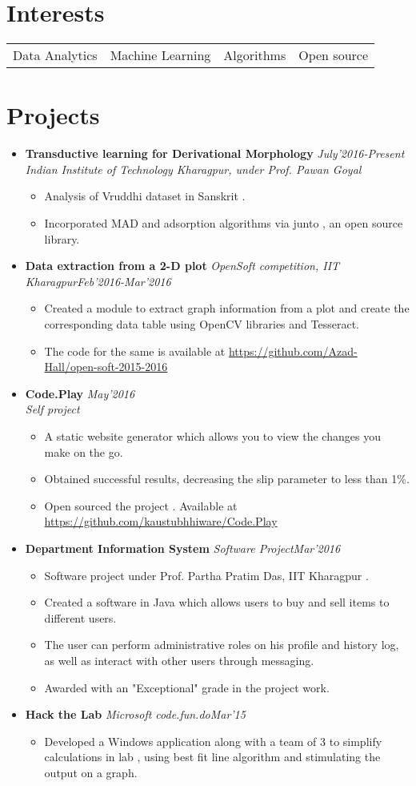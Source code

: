 \documentclass[11pt,a4paper]{moderncv}
\newcommand{\experience}[4]{
  \vspace{0.1cm}
\item \textbf{\large{#1}} \textit{#2}\hfill\textit{#3}
  \begin{itemize}[leftmargin=*]
    \setlength\itemsep{0em} #4
  \end{itemize}
}
\newcommand{\experiencetwo}[4]{
  \vspace{0.1cm}
\item \textbf{\large{#1}} \hfill\textit{#3}\\\textit{#2}
  \begin{itemize}[leftmargin=*]
    \setlength\itemsep{0em} #4
  \end{itemize}
}
\begin{document}
\section*{Interests}
\begin{tabular}{L{4cm} L{4cm} L{3.4cm} l}
 Data Analytics & Machine Learning & Algorithms & Open source \\
\end{tabular}

\vspace{-0.1cm}
\section*{Projects}
\begin{itemize}
  \setlength\itemsep{0.5em}

  \experiencetwo{Transductive learning for Derivational Morphology}{Indian Institute of Technology Kharagpur, under Prof. Pawan Goyal}{July'2016-Present}{
   \item Analysis of Vruddhi dataset in Sanskrit .
   \item Incorporated MAD and adsorption algorithms via junto , an open source library.
  }

  \experience{Data extraction from a 2-D plot}{OpenSoft competition, IIT Kharagpur}{Feb'2016-Mar'2016}{
  \item Created a module to extract graph information from a plot and create the corresponding data table using OpenCV libraries and Tesseract.
  \item The code for the same is available at \url{https://github.com/Azad-Hall/open-soft-2015-2016}
  }
  
  \experiencetwo{Code.Play}{Self project}{May'2016}{
  \item A static website generator which allows you to view the changes you make on the go.
  \item Obtained successful results, decreasing the slip parameter to less
    than 1\%.  
  \item Open sourced the project . Available at \url{https://github.com/kaustubhhiware/Code.Play}
  }

  \experience{Department Information System}{Software Project}{Mar'2016}{
  \item Software project under Prof. Partha Pratim Das, IIT Kharagpur .
  \item Created a software in Java which allows users to buy and sell items to different users.
  \item The user can perform administrative roles on his profile and history log, as well as interact with other users through messaging.
  \item Awarded with an "Exceptional" grade in the project work.
  }

  \experience{Hack the Lab}{Microsoft code.fun.do}{Mar'15}{
  \item   Developed a Windows application along  with a team of 3 to simplify calculations in lab , using best fit line algorithm and stimulating the output on a graph.
  }

\end{itemize}
\end{document}
